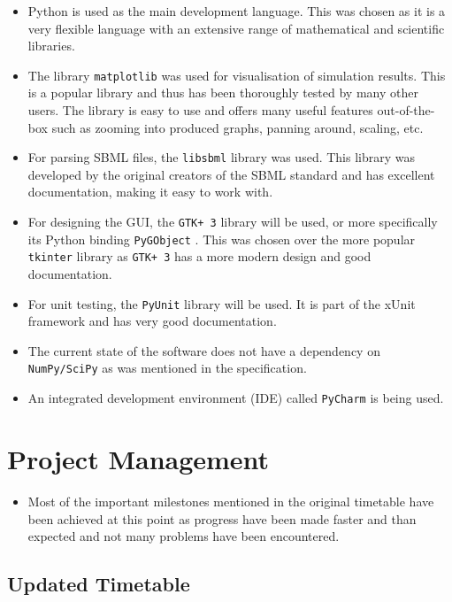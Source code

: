 \documentclass{article}
\begin{document}
	\begin{itemize}
		\item Python is used as the main development language. This was chosen as it is a very flexible language with an extensive range of mathematical and scientific libraries.
		\item The library \verb|matplotlib| \cite{matplotlib} was used for visualisation of simulation results. This is a popular library and thus has been thoroughly tested by many other users. The library is easy to use and offers many useful features out-of-the-box such as zooming into produced graphs, panning around, scaling, etc.
		\item For parsing SBML files, the \verb|libsbml| \cite{libsbml} library was used. This library was developed by the original creators of the SBML standard and has excellent documentation, making it easy to work with.
		\item For designing the GUI, the \verb|GTK+ 3| \cite{gtk} library will be used, or more specifically its Python binding \verb|PyGObject| \cite{gtk_python}. This was chosen over the more popular \verb|tkinter| \cite{tkinter} library as \verb|GTK+ 3| has a more modern design and good documentation.
		\item For unit testing, the \verb|PyUnit| \cite{pyunit} library will be used. It is part of the xUnit framework and has very good documentation.
		\item The current state of the software does not have a dependency on \verb|NumPy/SciPy| \cite{numpy, scipy} as was mentioned in the specification.
		\item An integrated development environment (IDE) called \verb|PyCharm| \cite{pycharm} is being used.	
\end{itemize}
	
	
	
	\section{Project Management}
	\begin{itemize}
		\item Most of the important milestones mentioned in the original timetable have been achieved at this point as progress have been made faster and than expected and not many problems have been encountered.
	\end{itemize}
	
	\subsection{Updated Timetable}
	
\end{document}
